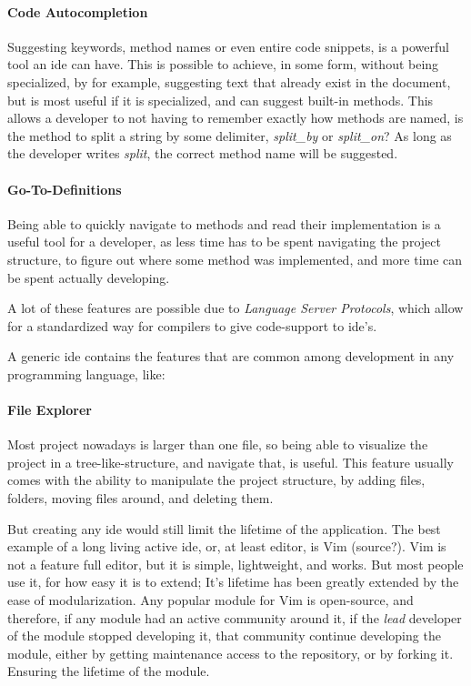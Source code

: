 \paragraph{Code Autocompletion} Suggesting keywords, method names or even entire
code snippets, is a powerful tool an \gls{ide} can have. This is possible to
achieve, in some form, without being specialized, by for example, suggesting
text that already exist in the document, but is most useful if it is
specialized, and can suggest built-in methods. This allows a developer to not
having to remember exactly how methods are named, is the method to split a
string by some delimiter, \textit{split\_by} or \textit{split\_on}? As long as
the developer writes \textit{split}, the correct method name will be suggested.

\paragraph{Go-To-Definitions} Being able to quickly navigate to methods and read
their implementation is a useful tool for a developer, as less time has to be
spent navigating the project structure, to figure out where some method was
implemented, and more time can be spent actually developing.

A lot of these features are possible due to \textit{Language Server Protocols},
which allow for a standardized way for compilers to give code-support to
\gls{ide}'s.


A generic \gls{ide} contains the features that are common among development in
any programming language, like:

\paragraph{File Explorer} Most project nowadays is larger than one file, so
being able to visualize the project in a tree-like-structure, and navigate that,
is useful. This feature usually comes with the ability to manipulate the project
structure, by adding files, folders, moving files around, and deleting them.


But creating any \gls{ide} would still limit the lifetime of the application. The best
example of a long living active \gls{ide}, or, at least editor, is Vim (source?). Vim
is not a feature full editor, but it is simple, lightweight, and works. But most
people use it, for how easy it is to extend; It's lifetime has been greatly
extended by the ease of modularization. Any popular module for Vim is
open-source, and therefore, if any module had an active community around it, if
the \textit{lead} developer of the module stopped developing it, that community
continue developing the module, either by getting maintenance access to the
repository, or by forking it. Ensuring the lifetime of the module.


